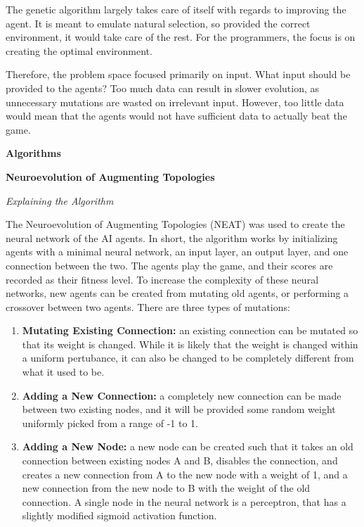 \documentclass[12pt]{article}
\begin{document}
\begin{flushleft}
The genetic algorithm largely takes care of itself with regards to improving the agent. It is meant to emulate natural selection, so provided the correct environment, it would take care of the rest. For the programmers, the focus is on creating the optimal environment.

Therefore, the problem space focused primarily on input. What input should be provided to the agents? Too much data can result in slower evolution, as unnecessary mutations are wasted on irrelevant input. However, too little data would mean that the agents would not have sufficient data to actually beat the game.

\hfill

\noindent\textbf{Algorithms}

\noindent\textbf{Neuroevolution of Augmenting Topologies}

\noindent\emph{Explaining the Algorithm}

The Neuroevolution of Augmenting Topologies (NEAT) was used to create the neural network of the AI agents. In short, the algorithm works by initializing agents with a minimal neural network, an input layer, an output layer, and one connection between the two. The agents play the game, and their scores are recorded as their fitness level. To increase the complexity of these neural networks, new agents can be created from mutating old agents, or performing a crossover between two agents. There are three types of mutations:

\begin{enumerate}
  \item\textbf{Mutating Existing Connection:} an existing connection can be mutated so that its weight is changed. While it is likely that the weight is changed within a uniform pertubance, it can also be changed to be completely different from what it used to be.
  \item\textbf{Adding a New Connection:} a completely new connection can be made between two existing nodes, and it will be provided some random weight uniformly picked from a range of -1 to 1.
  \item\textbf{Adding a New Node:} a new node can be created such that it takes an old connection between existing nodes A and B, disables the connection, and creates a new connection from A to the new node with a weight of 1, and a new connection from the new node to B with the weight of the old connection. A single node in the neural network is a perceptron, that has a slightly modified sigmoid activation function.
\end{enumerate}


\end{flushleft}
\end{document}
